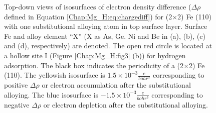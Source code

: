 \begin{figure}[!ht]
\caption[Top-down views of isosurfaces of electron density difference ($\Delta \rho$ defined in Equation \ref{Chap:Mg_H:eq:chargediff}) for (2$\times$2) Fe (110) with one substitutional alloying atom in top surface layer.]{Top-down views of isosurfaces of electron density difference ($\Delta \rho$ defined in Equation \ref{Chap:Mg_H:eq:chargediff}) for (2$\times$2) Fe (110) with one substitutional alloying atom in top surface layer. Surface Fe and alloy element ``X'' (X as As, Ge. Ni and Be in (a), (b), (c) and (d), respectively) are denoted. The open red circle is located at a hollow site I (Figure \ref{Chap:Mg_H:fig3} (b)) for hydrogen adsorption. The black box indicates the periodicity of a (2$\times$2) Fe (110). The yellowish isosurface is $1.5\times10^{-3}\frac{e}{bohr^3}$ corresponding to positive $\Delta \rho$ or electron accumulation after the substitutional alloying. The blue isosurface is $-1.5\times10^{-3}\frac{e}{bohr^3}$ corresponding to negative $\Delta \rho$ or electron depletion after the substitutional alloying.}
  \label{Chap:Mg_H:fig9}
\end{figure}
\endgroup






